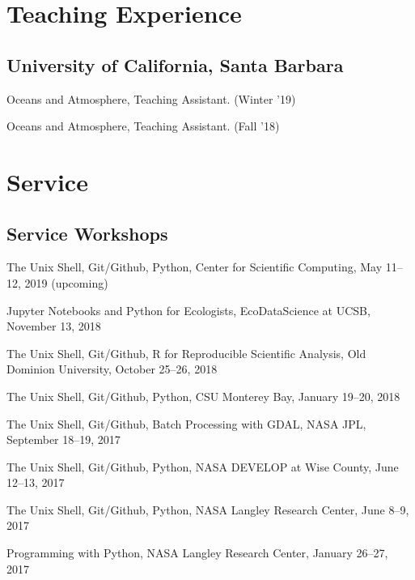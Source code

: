 \documentclass[12pt,letterpaper]{report}
\newcommand{\listitemspace}{0.15em}
\renewenvironment{itemize}
{\begin{list}{}{\setlength{\leftmargin}{0em}
			\setlength{\parskip}{0em}
			\setlength{\itemsep}{\listitemspace}
			\setlength{\parsep}{\listitemspace}}}
	{\end{list}}
\begin{document}
	
	
	\section*{Teaching Experience}
	
	\subsection*{University of California, Santa Barbara}
	
	\begin{itemize}
		
        \item Oceans and Atmosphere, Teaching Assistant. (Winter '19)

		\item Oceans and Atmosphere, Teaching Assistant. (Fall '18)
		
	\end{itemize}
	
	
	
	\section*{Service}
	
	\subsection*{Service Workshops}
	
	\begin{itemize}
		
        \item The Unix Shell, Git/Github, Python, Center for Scientific Computing, May 11--12, 2019 (upcoming)

        \item Jupyter Notebooks and Python for Ecologists, EcoDataScience at UCSB, November 13, 2018

        \item The Unix Shell, Git/Github, R for Reproducible Scientific Analysis, Old Dominion University, October 25--26, 2018

        \item The Unix Shell, Git/Github, Python, CSU Monterey Bay, January 19--20, 2018

        \item The Unix Shell, Git/Github, Batch Processing with GDAL, NASA JPL, September 18--19, 2017

        \item The Unix Shell, Git/Github, Python, NASA DEVELOP at Wise County, June 12--13, 2017

        \item The Unix Shell, Git/Github, Python, NASA Langley Research Center, June 8--9, 2017
		
        \item Programming with Python, NASA Langley Research Center, January 26--27, 2017 
		
	\end{itemize}
	
\end{document}

